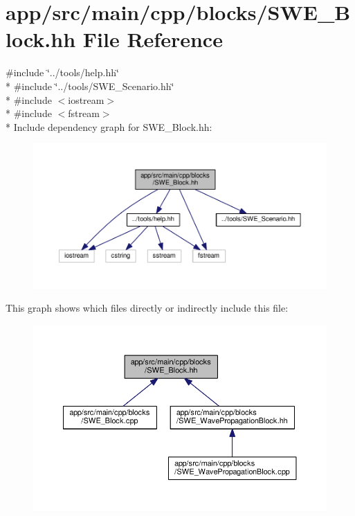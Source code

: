\hypertarget{SWE__Block_8hh}{}\section{app/src/main/cpp/blocks/\+S\+W\+E\+\_\+\+Block.hh File Reference}
\label{SWE__Block_8hh}
{\ttfamily \#include \char`\"{}../tools/help.\+hh\char`\"{}}\\*
{\ttfamily \#include \char`\"{}../tools/\+S\+W\+E\+\_\+\+Scenario.\+hh\char`\"{}}\\*
{\ttfamily \#include $<$iostream$>$}\\*
{\ttfamily \#include $<$fstream$>$}\\*
Include dependency graph for S\+W\+E\+\_\+\+Block.\+hh\+:\nopagebreak
\begin{figure}[H]
\begin{center}
\leavevmode
\includegraphics[width=350pt]{SWE__Block_8hh__incl}
\end{center}
\end{figure}
This graph shows which files directly or indirectly include this file\+:\nopagebreak
\begin{figure}[H]
\begin{center}
\leavevmode
\includegraphics[width=350pt]{SWE__Block_8hh__dep__incl}
\end{center}
\end{figure}
